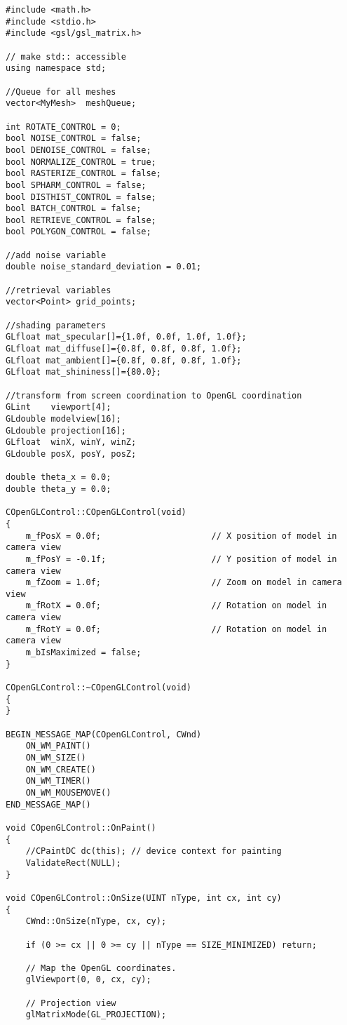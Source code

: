 \begin{enumerate}[1.]
\begin{lstlisting}[xleftmargin=0em]
#include <math.h>
#include <stdio.h>
#include <gsl/gsl_matrix.h>

// make std:: accessible
using namespace std;

//Queue for all meshes
vector<MyMesh>  meshQueue;

int ROTATE_CONTROL = 0;
bool NOISE_CONTROL = false;
bool DENOISE_CONTROL = false;
bool NORMALIZE_CONTROL = true;
bool RASTERIZE_CONTROL = false;
bool SPHARM_CONTROL = false;
bool DISTHIST_CONTROL = false;
bool BATCH_CONTROL = false;
bool RETRIEVE_CONTROL = false;
bool POLYGON_CONTROL = false;

//add noise variable
double noise_standard_deviation = 0.01; 

//retrieval variables
vector<Point> grid_points;

//shading parameters
GLfloat mat_specular[]={1.0f, 0.0f, 1.0f, 1.0f};
GLfloat mat_diffuse[]={0.8f, 0.8f, 0.8f, 1.0f};
GLfloat mat_ambient[]={0.8f, 0.8f, 0.8f, 1.0f};
GLfloat mat_shininess[]={80.0};

//transform from screen coordination to OpenGL coordination
GLint    viewport[4]; 
GLdouble modelview[16]; 
GLdouble projection[16]; 
GLfloat  winX, winY, winZ; 
GLdouble posX, posY, posZ;

double theta_x = 0.0;
double theta_y = 0.0;

COpenGLControl::COpenGLControl(void)
{
	m_fPosX = 0.0f;						 // X position of model in camera view
	m_fPosY = -0.1f;					 // Y position of model in camera view
	m_fZoom = 1.0f;						 // Zoom on model in camera view
	m_fRotX = 0.0f;						 // Rotation on model in camera view
	m_fRotY	= 0.0f;						 // Rotation on model in camera view
	m_bIsMaximized = false;
}

COpenGLControl::~COpenGLControl(void)
{
}

BEGIN_MESSAGE_MAP(COpenGLControl, CWnd)
	ON_WM_PAINT()
	ON_WM_SIZE()
	ON_WM_CREATE()
	ON_WM_TIMER()
	ON_WM_MOUSEMOVE()
END_MESSAGE_MAP()

void COpenGLControl::OnPaint()
{
	//CPaintDC dc(this); // device context for painting
	ValidateRect(NULL);
}

void COpenGLControl::OnSize(UINT nType, int cx, int cy)
{
	CWnd::OnSize(nType, cx, cy);

	if (0 >= cx || 0 >= cy || nType == SIZE_MINIMIZED) return;

	// Map the OpenGL coordinates.
	glViewport(0, 0, cx, cy);

	// Projection view
	glMatrixMode(GL_PROJECTION);


\end{lstlisting}
\end{enumerate}
